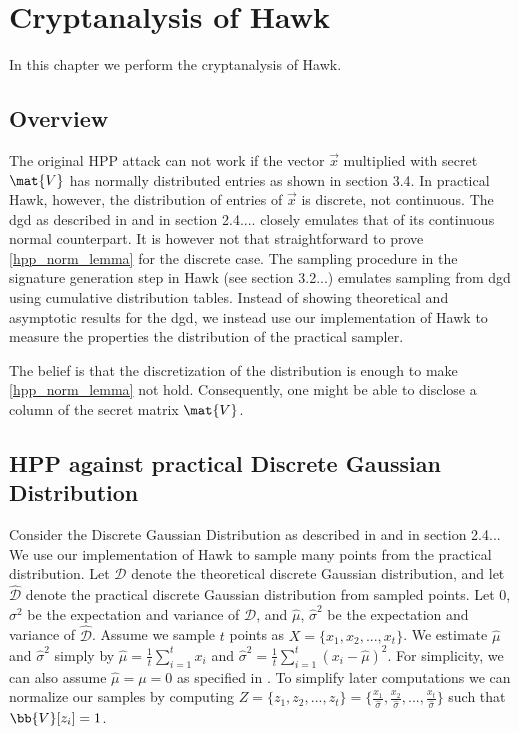 
\newcommand{\dgd}{\mathcal{D}}
\newcommand{\dgdi}{\widehat{\mathcal{D}}}

\chapter{Cryptanalysis of Hawk}
In this chapter we perform the cryptanalysis of Hawk.
\section{Overview}


The original HPP attack can not work if the vector $\vec{x}$ multiplied with secret $\mat{V}$ has normally distributed entries as shown in section 3.4.
In practical Hawk, however, the distribution of entries of $\vec{x}$ is discrete, not continuous. The \gls{dgd} as described in \cite{HawkSpec24} and in section 2.4.... closely emulates
that of its continuous normal counterpart. It is however not that straightforward to prove \ref{hpp_norm_lemma} for the discrete case.
The sampling procedure in the signature generation step in Hawk (see section 3.2...) emulates sampling from \gls{dgd} using cumulative distribution tables.
Instead of showing theoretical and asymptotic results for the \gls{dgd}, we instead use our implementation of Hawk to measure the properties the distribution of the practical sampler.

The belief is that the discretization of the distribution is enough to make \ref{hpp_norm_lemma} not hold. Consequently, one might be able to disclose a column of the secret matrix $\mat{V}$.

\section{HPP against practical Discrete Gaussian Distribution}
Consider the Discrete Gaussian Distribution as described in \cite{HawkSpec24} and in section 2.4... We use our implementation of Hawk to sample many points from the practical distribution.
Let $\dgd$ denote the theoretical discrete Gaussian distribution, and let $\dgdi$ denote the practical discrete Gaussian distribution from sampled points.
Let $0$, $\sigma^2$ be the expectation and variance of $\dgd$, and $\hat{\mu}$, $\hat{\sigma}^2$ be the expectation and variance of $\dgdi$.
Assume we sample $t$ points as $X = \{x_1, x_2, ..., x_t\}$. We estimate $\hat{\mu}$ and $\hat{\sigma}^2$ simply by $\hat{\mu} = \frac{1}{t} \sum_{i=1}^{t} x_i$ and $\hat{\sigma}^2 = \frac{1}{t} \sum_{i=1}^{t}(x_i - \hat{\mu})^2$.
For simplicity, we can also assume $\hat{\mu} = \mu = 0$ as specified in \cite{HawkSpec24}.
To simplify later computations we can normalize our samples by computing $Z = \{z_1, z_2, ..., z_t\} = \{\frac{x_1}{\hat{\sigma}}, \frac{x_2}{\hat{\sigma}},..., \frac{x_t}{\hat{\sigma}}\}$ such that 
$\bb{V}[z_i] = 1$.

